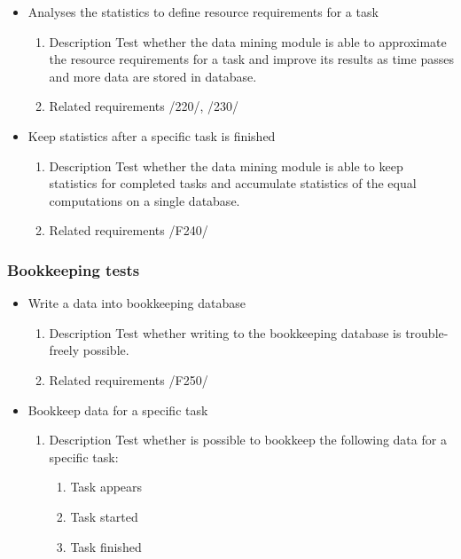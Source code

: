 {\begin{itemize}
				
				
				\item Analyses the statistics to define resource requirements for a task
				\begin{enumerate}
					\item Description\newline
Test whether the data mining module is able to approximate the resource requirements for a task and improve its results as time passes and more data are stored in database.
					\item Related requirements\newline
					/220/, /230/
				\end{enumerate}
				
				
				
				\item Keep statistics after a specific task is finished
				\begin{enumerate}
					\item Description\newline
Test whether the data mining module is able to keep statistics for completed tasks and accumulate statistics of the equal computations on a single database.
					\item Related requirements\newline
					/F240/
				\end{enumerate}
				
			
		\end{itemize}	
		\subsubsection{Bookkeeping tests}
		\begin{itemize}
		
		
				\item Write a data into bookkeeping database
				\begin{enumerate}
				
					\item Description\newline
Test whether writing to the bookkeeping database is trouble-freely possible.
					\item Related requirements\newline
					/F250/
				\end{enumerate}
		
		
		\item Bookkeep data for a specific task
				\begin{enumerate}
					\item Description\newline
Test whether is possible to bookkeep the following data for a specific task: 	
					\begin{enumerate}
					\item Task appears
					\item Task started
					\item Task finished 
					\end{enumerate}
					

\end{enumerate}
\end{itemize}}
